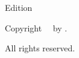 \clearpage

\begingroup
  \null\vfill\small

  \utitle\par
  Edition \uedition\par
  Copyright \textcopyright\ \udate\ by \uauthor.\par
  All rights reserved.
\endgroup

\clearpage
